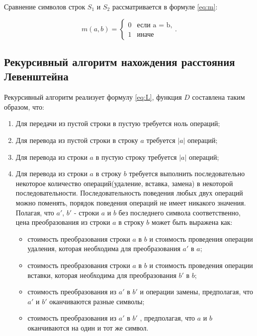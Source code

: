 Сравнение символов строк $S_1$ и $S_2$ рассматривается в формуле \ref{eq:m}:

\begin{equation}
	\label{eq:m}
	m(a, b) = \begin{cases}
		0 &\text{если a = b,}\\
		1 &\text{иначе}
	\end{cases}.
\end{equation}

\subsection{Рекурсивный алгоритм нахождения расстояния Левенштейна}

Рекурсивный алгоритм реализует формулу \ref{eq:L}, функция $D$ составлена таким образом, что:
\begin{enumerate}
	\item  Для передачи из пустой строки в пустую требуется ноль операций;
	\item Для перевода из пустой строки в строку $a$ требуется $|a|$ операций;
	\item Для перевода из строки $a$ в пустую строку требуется $|a|$ операций;
	\item Для перевода из строки $a$ в строку $b$ требуется выполнить последовательно некоторое количество операций(удаление, вставка, замена) в некоторой последовательности. Последовательность поведения любых двух операций можно поменять, порядок поведения операций не имеет никакого значения. Полагая, что $a'$, $b'$ - строки $a$ и $b$ без последнего символа соответственно, цена преобразования из строки $a$ в строку $b$ может быть выражена как:
	\begin{itemize}
		\item стоимость преобразования строки $a$ в $b$ и стоимость проведения операции удаления, которая необходима для преобразования $a'$ в $a$;
		\item стоимость преобразования строки $a$ в $b$ и стоимость проведения операции вставки, которая необходима для преобразования $b'$ в $b$;
		\item стоимость преобразования из $a'$ в $b'$ и операции замены, предполагая, что $a'$ и $b'$ оканчиваются разные символы;
		\item стоимость преобразования из $a'$ в $b'$ , предполагая, что $a$ и $b$ оканчиваются на один и тот же символ.
	\end{itemize}
\end{enumerate}

